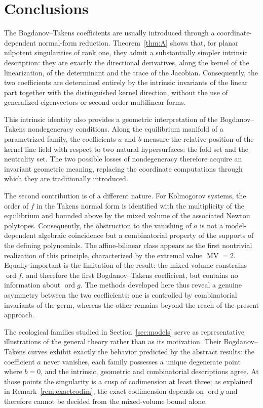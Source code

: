 \documentclass[12pt]{article}
\theoremstyle{plain}
\theoremstyle{definition}
\theoremstyle{remark}
\DeclareMathOperator{\MV}{MV}
\DeclareMathOperator{\ordop}{ord}
\begin{document}
	\section{Conclusions}
	
	The Bogdanov--Takens coefficients are usually introduced through a
	coordinate-dependent normal-form reduction. Theorem~\ref{thm:A} shows that,
	for planar nilpotent singularities of rank one, they admit a substantially
	simpler intrinsic description: they are exactly the directional derivatives,
	along the kernel of the linearization, of the determinant and the trace of the
	Jacobian. Consequently, the two coefficients are determined entirely by the
	intrinsic invariants of the linear part together with the distinguished kernel
	direction, without the use of generalized eigenvectors or second-order
	multilinear forms.
	
	This intrinsic identity also provides a geometric interpretation of the
	Bogdanov--Takens nondegeneracy conditions. Along the equilibrium manifold of a
	parametrized family, the coefficients $a$ and $b$ measure the relative position
	of the kernel line field with respect to two natural hypersurfaces: the fold
	set and the neutrality set. The two possible losses of nondegeneracy therefore
	acquire an invariant geometric meaning, replacing the coordinate computations
	through which they are traditionally introduced.
	
	The second contribution is of a different nature. For Kolmogorov systems, the
	order of $f$ in the Takens normal form is identified with the multiplicity of
	the equilibrium and bounded above by the mixed volume of the associated Newton
	polytopes. Consequently, the obstruction to the vanishing of $a$ is not a
	model-dependent algebraic coincidence but a combinatorial property of the
	supports of the defining polynomials. The affine-bilinear class appears as the
	first nontrivial realization of this principle, characterized by the extremal
	value $\MV=2$. Equally important is the limitation of the result: the mixed
	volume constrains $\ordop f$, and therefore the first Bogdanov--Takens
	coefficient, but contains no information about $\ordop g$. The methods
	developed here thus reveal a genuine asymmetry between the two coefficients:
	one is controlled by combinatorial invariants of the germ, whereas the other
	remains beyond the reach of the present approach.
	
	The ecological families studied in
	Section~\ref{sec:models} serve as representative illustrations of the general
	theory rather than as its motivation. Their Bogdanov--Takens curves exhibit
	exactly the behavior predicted by the abstract results: the coefficient $a$
	never vanishes, each family possesses a unique degenerate point where $b=0$,
	and the intrinsic, geometric and combinatorial descriptions agree. At those
	points the singularity is a cusp of codimension at least three; as explained in
	Remark~\ref{rem:exactcodim}, the exact codimension depends on $\ordop g$ and
	therefore cannot be decided from the mixed-volume bound alone.
	
\end{document}
